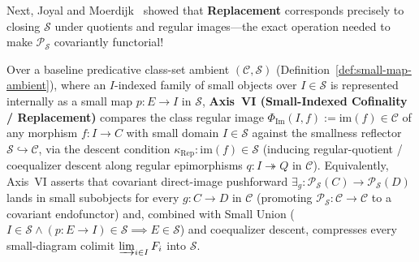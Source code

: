 Next, Joyal and Moerdijk~\cite[Ch.~I, \S\S 1--3]{JoyalMoerdijk95} showed that \textbf{Replacement} corresponds precisely to closing $\mathcal{S}$ under quotients and regular images---the exact operation needed to make $\mathcal{P}_{\mathcal{S}}$ covariantly functorial!

\begin{definition}\label{def:axis-vi-replacement}%
%
Over a baseline predicative class-set ambient $(\mathcal{C}, \mathcal{S})$ (Definition~\ref{def:small-map-ambient}), where an $I$-indexed family of small objects over $I \in \mathcal{S}$ is represented internally as a small map $p : E \to I$ in $\mathcal{S}$, \textbf{Axis~VI (Small-Indexed Cofinality / Replacement)} compares the class regular image $\Phi_{\mathrm{Im}}(I, f) := \mathrm{im}(f) \in \mathcal{C}$ of any morphism $f : I \to C$ with small domain $I \in \mathcal{S}$ against the smallness reflector $\mathcal{S} \hookrightarrow \mathcal{C}$, via the descent condition $\kappa_{\mathrm{Rep}} : \mathrm{im}(f) \in \mathcal{S}$ (inducing regular-quotient / coequalizer descent along regular epimorphisms $q : I \twoheadrightarrow Q$ in $\mathcal{C}$). Equivalently, Axis~VI asserts that covariant direct-image pushforward $\exists_g : \mathcal{P}_{\mathcal{S}}(C) \to \mathcal{P}_{\mathcal{S}}(D)$ lands in small subobjects for every $g : C \to D$ in $\mathcal{C}$ (promoting $\mathcal{P}_{\mathcal{S}} : \mathcal{C} \to \mathcal{C}$ to a covariant endofunctor) and, combined with Small Union ($I \in \mathcal{S} \wedge (p : E \to I) \in \mathcal{S} \implies E \in \mathcal{S}$) and coequalizer descent, compresses every small-diagram colimit $\varinjlim_{i \in I} F_i$ into $\mathcal{S}$.
\end{definition}

